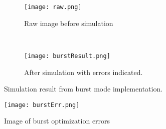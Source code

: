 \begin{figure}[H]
	\centering
	\begin{subfigure}[b]{0.5\textwidth}
		\texttt{[image: raw.png]}
		\caption{Raw image before simulation}
		\label{fig:raw_burst}
    \end{subfigure}%
        ~ %
    \begin{subfigure}[b]{0.5\textwidth}
    	\texttt{[image: burstResult.png]}
    	\caption{After simulation with errors indicated.}
    	\label{fig:burst_picture_sobel}
	\end{subfigure}
	\caption{Simulation result from burst mode implementation.}
    	\label{fig:burst_picture}
\end{figure}


\begin{figure}[H]
	\centering
	\texttt{[image: burstErr.png]}
	\caption{Image of burst optimization errors}
	\label{fig:pic_burst_err}
\end{figure}